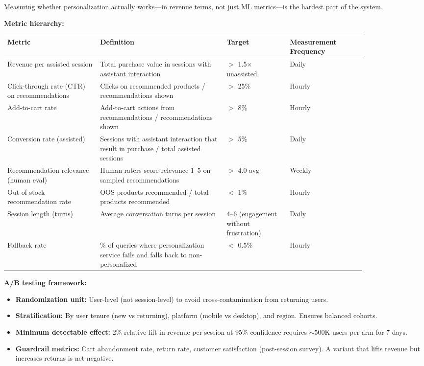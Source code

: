 Measuring whether personalization actually works---in revenue terms, not just ML metrics---is the hardest part of the system.

\textbf{Metric hierarchy:}

\begin{tabular}{|p{0.22\linewidth}|p{0.30\linewidth}|p{0.15\linewidth}|p{0.18\linewidth}|}
\hline
\textbf{Metric} & \textbf{Definition} & \textbf{Target} & \textbf{Measurement Frequency} \\
\hline
Revenue per assisted session & Total purchase value in sessions with assistant interaction & $>$ 1.5$\times$ unassisted & Daily \\
\hline
Click-through rate (CTR) on recommendations & Clicks on recommended products / recommendations shown & $>$ 25\% & Hourly \\
\hline
Add-to-cart rate & Add-to-cart actions from recommendations / recommendations shown & $>$ 8\% & Hourly \\
\hline
Conversion rate (assisted) & Sessions with assistant interaction that result in purchase / total assisted sessions & $>$ 5\% & Daily \\
\hline
Recommendation relevance (human eval) & Human raters score relevance 1--5 on sampled recommendations & $>$ 4.0 avg & Weekly \\
\hline
Out-of-stock recommendation rate & OOS products recommended / total products recommended & $<$ 1\% & Hourly \\
\hline
Session length (turns) & Average conversation turns per session & 4--6 (engagement without frustration) & Daily \\
\hline
Fallback rate & \% of queries where personalization service fails and falls back to non-personalized & $<$ 0.5\% & Hourly \\
\hline
\end{tabular}

\textbf{A/B testing framework:}

\begin{itemize}
  \item \textbf{Randomization unit:} User-level (not session-level) to avoid cross-contamination from returning users.
  \item \textbf{Stratification:} By user tenure (new vs returning), platform (mobile vs desktop), and region. Ensures balanced cohorts.
  \item \textbf{Minimum detectable effect:} 2\% relative lift in revenue per session at 95\% confidence requires $\sim$500K users per arm for 7 days.
  \item \textbf{Guardrail metrics:} Cart abandonment rate, return rate, customer satisfaction (post-session survey). A variant that lifts revenue but increases returns is net-negative.
\end{itemize}

